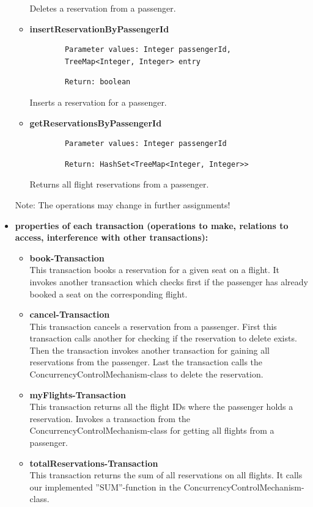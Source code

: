 \documentclass{vldb}
\begin{document}
\begin{itemize}
\begin{itemize}
Deletes a reservation from a passenger.
\item \textbf{insertReservationByPassengerId}
	\begin{verbatim}
		Parameter values: Integer passengerId,
		TreeMap<Integer, Integer> entry
	\end{verbatim}
	\begin{verbatim}
		Return: boolean
	\end{verbatim}
Inserts a reservation for a passenger.
\item \textbf{getReservationsByPassengerId}
	\begin{verbatim}
		Parameter values: Integer passengerId
	\end{verbatim}
	\begin{verbatim}
		Return: HashSet<TreeMap<Integer, Integer>>
	\end{verbatim}
Returns all flight reservations from a passenger.
\end{itemize}
Note: The operations may change in further assignments!
\item \textbf{properties of each transaction (operations to make, relations to access, interference with other transactions):}
\begin{itemize}
\item \textbf{book-Transaction}
\\This transaction books a reservation for a given seat on a flight. It invokes another transaction which checks first if the passenger has already booked a seat on the corresponding flight.
\item \textbf{cancel-Transaction}
\\This transaction cancels a reservation from a passenger. First this transaction calls another for checking if the reservation to delete exists. Then the transaction invokes another transaction for gaining all reservations from the passenger. Last the transaction calls the ConcurrencyControlMechanism-class to delete the reservation.
\item \textbf{myFlights-Transaction}
\\This transaction returns all the flight IDs where the passenger holds a reservation. Invokes a transaction from the ConcurrencyControlMechanism-class for getting all flights from a passenger.
\item \textbf{totalReservations-Transaction}
\\This transaction returns the sum of all reservations on all flights. It calls our implemented ''SUM''-function in the ConcurrencyControlMechanism-class.

\end{itemize}
\end{itemize}
\end{document}
